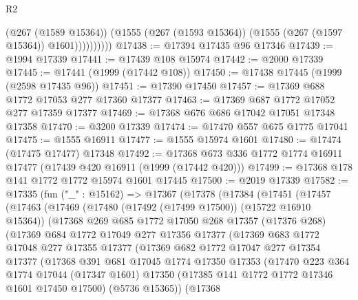 \begin{lexlean}{R2}
\begin{coremodule}
                    (@267 (@1589 @15364))
                    (@1555 (@267 (@1593 @15364)) (@1555 (@267 (@1597 @15364)) @1601))))))))))
@17438 := @17394 @17435 @96 @17346
@17439 := @1994 @17339
@17441 := @17439 @108 @15974
@17442 := @2000 @17339
@17445 := @17441 (@1999 (@17442 @108))
@17450 := @17438 @17445 (@1999 (@2598 @17435 @96))
@17451 := @17390 @17450
@17457 := @17369 @688 @1772 @17053 @277 @17360 @17377
@17463 := @17369 @687 @1772 @17052 @277 @17359 @17377
@17469 := @17368 @676 @686 @17042 @17051 @17348 @17358
@17470 := @3200 @17339
@17474 := @17470 @557 @675 @1775 @17041
@17475 := @1555 @16911
@17477 := @1555 @15974 @1601
@17480 := @17474 (@17475 @17477) @17348
@17492 := @17368 @673 @336 @1772 @1774 @16911 @17477 (@17439 @420 @16911 (@1999 (@17442 @420)))
@17499 := @17368 @178 @141 @1772 @1772 @15974 @1601 @17445
@17500 := @2019 @17339
@17582 := @17335
    (fun ("_" : @15162) =>
    @17367
      (@17378
        (@17384
          (@17451
            (@17457
              (@17463
                (@17469
                  (@17480 (@17492 (@17499 @17500)) (@15722 @16910 @15364))
                  (@17368
                    @269
                    @685
                    @1772
                    @17050
                    @268
                    @17357
                    (@17376 @268)
                    (@17369
                      @684
                      @1772
                      @17049
                      @277
                      @17356
                      @17377
                      (@17369
                        @683
                        @1772
                        @17048
                        @277
                        @17355
                        @17377
                        (@17369
                          @682
                          @1772
                          @17047
                          @277
                          @17354
                          @17377
                          (@17368
                            @391
                            @681
                            @17045
                            @1774
                            @17350
                            @17353
                            (@17470
                              @223
                              @364
                              @1774
                              @17044
                              (@17347 @1601)
                              @17350
                              (@17385 @141 @1772 @1772 @17346 @1601 @17450 @17500)
                              (@5736 @15365))
                            (@17368

\end{coremodule}
\end{lexlean}

